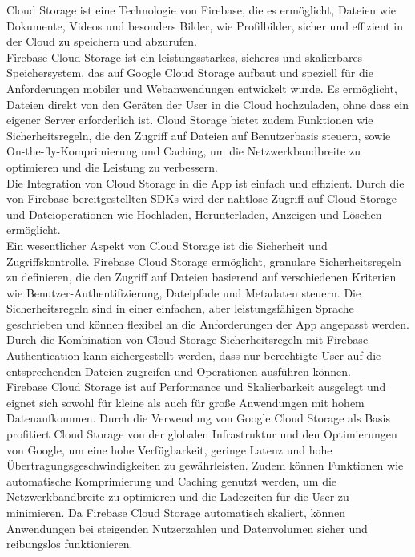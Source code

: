 Cloud Storage ist eine Technologie von Firebase, die es ermöglicht, Dateien wie Dokumente, Videos und besonders Bilder, wie Profilbilder, sicher und effizient in der Cloud zu speichern und abzurufen.
\\
Firebase Cloud Storage ist ein leistungsstarkes, sicheres und skalierbares Speichersystem, das auf Google Cloud Storage aufbaut und speziell für die Anforderungen mobiler und Webanwendungen entwickelt wurde. Es ermöglicht, Dateien direkt von den Geräten der User in die Cloud hochzuladen, ohne dass ein eigener Server erforderlich ist. Cloud Storage bietet zudem Funktionen wie Sicherheitsregeln, die den Zugriff auf Dateien auf Benutzerbasis steuern, sowie On-the-fly-Komprimierung und Caching, um die Netzwerkbandbreite zu optimieren und die Leistung zu verbessern.
\\
Die Integration von Cloud Storage in die App ist einfach und effizient. Durch die von Firebase bereitgestellten SDKs wird der nahtlose Zugriff auf Cloud Storage und Dateioperationen wie Hochladen, Herunterladen, Anzeigen und Löschen ermöglicht.
\\
Ein wesentlicher Aspekt von Cloud Storage ist die Sicherheit und Zugriffskontrolle. Firebase Cloud Storage ermöglicht, granulare Sicherheitsregeln zu definieren, die den Zugriff auf Dateien basierend auf verschiedenen Kriterien wie Benutzer-Authentifizierung, Dateipfade und Metadaten steuern. Die Sicherheitsregeln sind in einer einfachen, aber leistungsfähigen Sprache geschrieben und können flexibel an die Anforderungen der App angepasst werden. Durch die Kombination von Cloud Storage-Sicherheitsregeln mit Firebase Authentication kann sichergestellt werden, dass nur berechtigte User auf die entsprechenden Dateien zugreifen und Operationen ausführen können.
\\
Firebase Cloud Storage ist auf Performance und Skalierbarkeit ausgelegt und eignet sich sowohl für kleine als auch für große Anwendungen mit hohem Datenaufkommen. Durch die Verwendung von Google Cloud Storage als Basis profitiert Cloud Storage von der globalen Infrastruktur und den Optimierungen von Google, um eine hohe Verfügbarkeit, geringe Latenz und hohe Übertragungsgeschwindigkeiten zu gewährleisten. Zudem können Funktionen wie automatische Komprimierung und Caching genutzt werden, um die Netzwerkbandbreite zu optimieren und die Ladezeiten für die User zu minimieren. Da Firebase Cloud Storage automatisch skaliert, können Anwendungen bei steigenden Nutzerzahlen und Datenvolumen sicher und reibungslos funktionieren.

